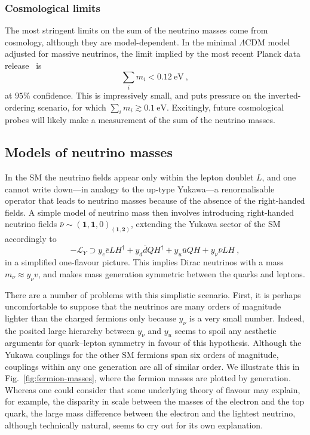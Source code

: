 \subsubsection{Cosmological limits}

The most stringent limits on the sum of the neutrino masses come from cosmology,
although they are model-dependent. In the minimal $\Lambda$CDM model adjusted
for massive neutrinos, the limit implied by the most recent Planck data
release~\cite{Aghanim:2018eyx} is
\begin{equation}
  \sum_{i} m_{i} < \SI{0.12}{\eV} \ ,
\end{equation}
at $95\%$ confidence. This is impressively small, and puts pressure on the
inverted-ordering scenario, for which $\sum_{i} m_{i} \gtrsim \SI{0.1}{\eV}$.
Excitingly, future cosmological probes will likely make a measurement of the sum
of the neutrino masses.

\subsection{Models of neutrino masses}
\label{sec:models-of-mv}

In the SM the neutrino fields appear only within the lepton doublet $L$, and one
cannot write down---in analogy to the up-type Yukawa---a renormalisable operator
that leads to neutrino masses because of the absence of the right-handed fields.
A simple model of neutrino mass then involves introducing right-handed neutrino
fields $\bar{\nu} \sim (\mathbf{1}, \mathbf{1}, 0)_{(\mathbf{1}, \mathbf{2})}$,
extending the Yukawa sector of the SM accordingly to
\begin{equation}
  -\mathscr{L}_{Y} \supset y_{e}\bar{e}LH^{\dagger} + y_{d}\bar{d}QH^{\dagger} + y_{u} \bar{u}QH + y_{\nu}\bar{\nu}LH \ ,
\end{equation}
in a simplified one-flavour picture. This implies Dirac neutrinos with a mass
$m_{\nu} \approx y_{\nu} v$, and makes mass generation symmetric between the
quarks and leptons.

There are a number of problems with this simplistic scenario. First, it is
perhaps uncomfortable to suppose that the neutrinos are many orders of magnitude
lighter than the charged fermions only because $y_{\nu}$ is a very small number.
Indeed, the posited large hierarchy between $y_{\nu}$ and $y_{u}$ seems to spoil
any aesthetic arguments for quark--lepton symmetry in favour of this hypothesis.
Although the Yukawa couplings for the other SM fermions span six orders of
magnitude, couplings within any one generation are all of similar order. We
illustrate this in Fig.~\ref{fig:fermion-masses}, where the fermion masses are
plotted by generation. Whereas one could consider that some underlying theory of
flavour may explain, for example, the disparity in scale between the masses of
the electron and the top quark, the large mass difference between the electron
and the lightest neutrino, although technically natural, seems to cry out for
its own explanation.

